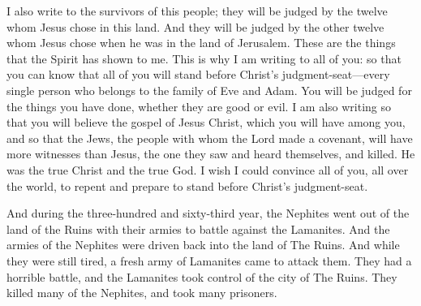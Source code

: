 I also write to the survivors of this people; they will be judged by the twelve whom Jesus chose in this land. And they will be judged by the other twelve whom Jesus chose when he was in the land of Jerusalem.
\bverse \iffalse And these things doth the Spirit manifest unto me; therefore I write unto you all. And for this cause I write unto you, that ye may know that ye must all stand before the judgment-seat of Christ, yea, every soul who belongs to the whole human family of Adam; and ye must stand to be judged of your works, whether they be good or evil; \fi
These are the things that the Spirit has shown to me. This is why I am writing to all of you: so that you can know that all of you will stand before Christ's judgment-seat---every single person who belongs to the family of Eve and Adam. You will be judged for the things you have done, whether they are good or evil.
\bverse \iffalse And also that ye may believe the gospel of Jesus Christ, which ye shall have among you; and also that the Jews, the covenant people of the Lord, shall have other witness besides him whom they saw and heard, that Jesus, whom they slew, was the very Christ and the very God. \fi
I am also writing so that you will believe the gospel of Jesus Christ, which you will have among you, and so that the Jews, the people with whom the Lord made a covenant, will have more witnesses than Jesus, the one they saw and heard themselves, and killed. He was the true Christ and the true God.
\bverse \iffalse And I would that I could persuade all ye ends of the earth to repent and prepare to stand before the judgment-seat of Christ. \fi
I wish I could convince all of you, all over the world, to repent and prepare to stand before Christ's judgment-seat.
\bchapter
\iffalse And now it came to pass that in the three hundred and sixty and third year the Nephites did go up with their armies to battle against the Lamanites, out of the land Desolation. \fi
And during the three-hundred and sixty-third year, the Nephites went out of the land of the Ruins with their armies to battle against the Lamanites.
\bverse \iffalse And it came to pass that the armies of the Nephites were driven back again to the land of Desolation. And while they were yet weary, a fresh army of the Lamanites did come upon them; and they had a sore battle, insomuch that the Lamanites did take possession of the city Desolation, and did slay many of the Nephites, and did take many prisoners. \fi
And the armies of the Nephites were driven back into the land of The Ruins. And while they were still tired, a fresh army of Lamanites came to attack them. They had a horrible battle, and the Lamanites took control of the city of The Ruins. They killed many of the Nephites, and took many prisoners.
